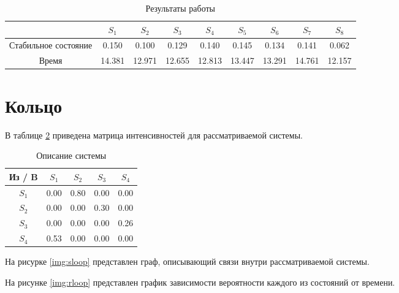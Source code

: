 \begin{table}[ht]
	\small
	\begin{center}
		\caption{Результаты работы}
		\label{tbl:res8}
		\begin{tabular}{|c|c|c|c|c|c|c|c|c|}
			\hline
			& $S_1$ & $S_2$ & $S_3$ & $S_4$ & $S_5$ & $S_6$ & $S_7$ & $S_8$ \\\hline
			Стабильное состояние &0.150 &  0.100 &  0.129 &  0.140 &  0.145 &  0.134 &  0.141 &  0.062 \\\hline
			Время & 14.381 & 12.971 & 12.655 & 12.813 & 13.447 & 13.291 & 14.761 & 12.157 \\\hline
		\end{tabular}
	\end{center}
\end{table}

\clearpage

\section{Кольцо}

В таблице \ref{tbl:systemloop} приведена матрица интенсивностей для рассматриваемой системы.

\begin{table}[ht]
	\begin{center}
		\caption{Описание системы}
		\label{tbl:systemloop}
		\begin{tabular}{|c|c|c|c|c|}
			\hline
			Из / B & $S_1$ & $S_2$ & $S_3$ & $S_4$ \\\hline
			$S_1$ & 0.00 & 0.80 & 0.00 & 0.00 \\\hline
			$S_2$ & 0.00 & 0.00 & 0.30 & 0.00 \\\hline
			$S_3$ & 0.00 & 0.00 & 0.00 & 0.26 \\\hline
			$S_4$ & 0.53 & 0.00 & 0.00 & 0.00 \\\hline
		\end{tabular}
	\end{center}
\end{table}

На рисурке \ref{img:sloop} представлен граф, описывающий связи внутри рассматриваемой системы.


На рисунке \ref{img:rloop} представлен график зависимости вероятности каждого из состояний от времени.


